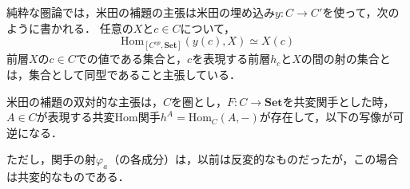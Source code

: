 \documentclass[uplatex, dvipdfmx]{jsreport}
\begin{document}
\begin{remark}
    純粋な圏論では，米田の補題の主張は米田の埋め込み$y:C\to C'$を使って，次のように書かれる．
    任意の$X$と$c\in C$について，$$\mathrm{Hom}_{[C^{op},\mathbf{Set}]}(y(c),X)\simeq X(c)$$
    前層$X$の$c\in C$での値である集合と，$c$を表現する前層$h_c$と$X$の間の射の集合とは，集合として同型であること主張している．
\end{remark}
\begin{remark}\rm{}
    米田の補題の双対的な主張は，$C$を圏とし，$F:C\to\mathbf{Set}$を共変関手とした時，$A\in C$が表現する共変Hom関手$h^A=\mathrm{Hom}_C(A,-)$が存在して，以下の写像が可逆になる．
    \begin{center}\end{center}
    ただし，関手の射$\varphi_a$（の各成分）は，以前は反変的なものだったが，この場合は共変的なものである．
    \begin{center}\end{center}
\end{remark}
\end{document}
